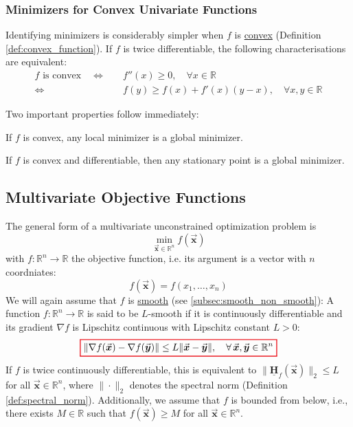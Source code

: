 \documentclass[9pt, headings=standardclasses, parskip=half]{scrartcl}
\newcommand{\matr}[1]{\underline{\boldsymbol{#1}}}
\newcommand{\vect}[1]{\vec{\boldsymbol{#1}}}
\begin{document}
\subsubsection{Minimizers for Convex Univariate Functions}
Identifying minimizers is considerably simpler when \(f\) is \hyperref[def:convex_function]{convex} (Definition \ref{def:convex_function}). 
If \(f\) is twice differentiable, the following characterisations are equivalent:
\[
\begin{aligned}
f\text{ is convex} \quad \Longleftrightarrow & \quad f''(x)\ge0,\quad \forall x\in\mathbb{R}\\[1mm]
\Longleftrightarrow & \quad f(y)\ge f(x)+f'(x)(y-x),\quad \forall x,y\in\mathbb{R}
\end{aligned}
\]

Two important properties follow immediately:

\begin{proposition}
If \(f\) is convex, any local minimizer is a global minimizer.
\end{proposition}

\begin{proposition}
If \(f\) is convex and differentiable, then any stationary point is a global minimizer.
\end{proposition}


\subsection{Multivariate Objective Functions}

The general form of a multivariate unconstrained optimization problem is
\[
\min_{\vect{x}\in\mathbb{R}^n} f(\vect{x})
\]
with \(f:\mathbb{R}^n\to\mathbb{R}\) the objective function, i.e. its argument is a vector with \(n\) coordniates:
\[
f(\vect{x})=f(x_1, \ldots, x_n)
\]
We will again assume that \(f\) is \hyperref[subsec:smooth_non_smooth]{smooth} (see \ref{subsec:smooth_non_smooth}):
A function \(f:\mathbb{R}^n\to\mathbb{R}\) is said to be {\color{red}\(L\)-smooth} if it is continuously differentiable and its gradient \(\nabla f\) is Lipschitz continuous with Lipschitz constant \(L>0\):
\begin{equation}
  \label{eq:L-smoothness_multivariate}
  {\color{Red}
  \setlength{\fboxrule}{1pt}
  \boxed{ 
  \color{black}
\|\nabla f(\vect{x})-\nabla f(\vect{y})\|\le L\|\vect{x}-\vect{y}\|,\quad \forall\, \vect{x},\vect{y}\in\mathbb{R}^n %
  }
  }
\end{equation}
If \(f\) is twice continuously differentiable, this is equivalent to \(\|\matr{H}_f(\vect{x})\|_{2}\le L\) for all \(\vect{x}\in\mathbb{R}^n\), where \(\|\cdot\|_{2}\) denotes the spectral norm (Definition \ref{def:spectral_norm}).
Additionally, we assume that \(f\) is bounded from below, i.e., there exists \(M\in\mathbb{R}\) such that \(f(\vect{x})\ge M\) for all \(\vect{x}\in\mathbb{R}^n\).
\end{document}

